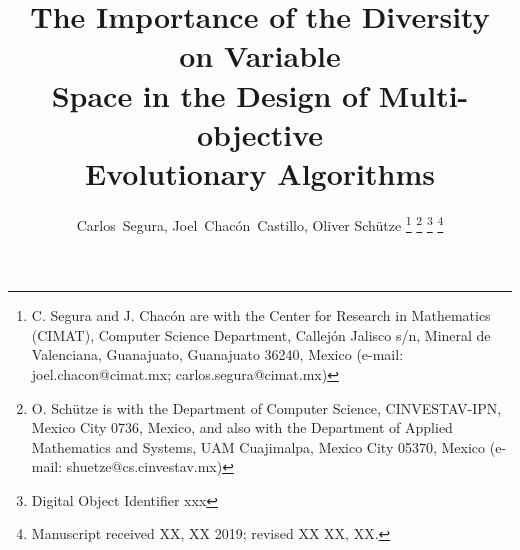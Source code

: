 \documentclass[journal]{IEEEtran}
\begin{document}
%
\title{The Importance of the Diversity on Variable \\ Space in the Design of Multi-objective \\Evolutionary Algorithms}
%
%
%

\author{Carlos~Segura, Joel~Chac\'on~Castillo, Oliver Sch\"{u}tze
\thanks{C. Segura and J. Chac\'on are with the Center for Research in Mathematics (CIMAT), Computer Science Department,
Callej\'on Jalisco s/n, Mineral de Valenciana, Guanajuato, Guanajuato 36240, Mexico (e-mail: joel.chacon@cimat.mx; carlos.segura@cimat.mx)}%
\thanks{O. Sch\"utze is with the Department of Computer Science, CINVESTAV-IPN, Mexico City 0736, Mexico, and also with the Department of Applied Mathematics and Systems, UAM Cuajimalpa, Mexico City 05370, Mexico (e-mail: shuetze@cs.cinvestav.mx)}
\thanks{Digital Object Identifier xxx}
\thanks{Manuscript received XX, XX 2019; revised XX XX, XX.}%
}



\end{document}
